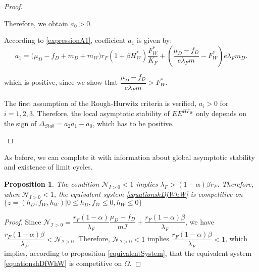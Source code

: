 \documentclass{article}
\newcommand{\lfw}{\lambda_{F}}
\newcommand{\lfw}{\lambda_{F}}
\newcommand{\cI}{\mathcal{I}}
\newtheorem{prop}{Proposition}
\begin{document}
\begin{proof}
\begin{itemize}
Therefore, we obtain $a_0 > 0$.

According to \eqref{expressionA1}, coefficient $a_1$ is given by:
\begin{equation*}
a_1 = \big( \mu_D  -f_D + m_D + m_W) r_F(1+ \beta H_W^*) \dfrac{F^*_W}{K_F} + \left(\dfrac{\mu_D -f_D}{e\lfw m} - F_W^*\right) e \lfw m_D .
\end{equation*}

which is positive, since we show that $\dfrac{\mu_D - f_D}{e \lfw m} > F^*_{W}$.

The first assumption of the Rough-Hurwitz criteria is verified, $a_i > 0$ for $i=1,2,3$. Therefore, the local asymptotic stability of $EE^{HF_W}$ only depends on the sign of $\Delta_{Stab}= a_2 a_1 - a_0$, which has to be positive.
\end{itemize}
\end{proof}

As before, we can complete it with information about global asymptotic stability and existence of limit cycles. 

\begin{prop}
The condition $\mathcal{N}_{I > 0} < 1$ implies $\lfw > (1-\alpha) \beta r_F$. Therefore, when $\mathcal{N}_{I > 0} < 1$, the equivalent system \eqref{equationshDfWhW} is competitive on $\Big\{z = (h_D, f_W, h_W) | 0 \leq h_D, f_W  \leq 0, h_W \leq 0 \Big\}$
\end{prop}

\begin{proof}
Since $\mathcal{N}_{\cI > 0} = \dfrac{r_F(1-\alpha)}{\lfw}\dfrac{\mu_D - f_D}{m \cI} + \dfrac{r_F(1-\alpha) \beta}{\lfw}$, we have $\dfrac{r_F(1-\alpha) \beta}{\lfw} < \mathcal{N}_{\cI > 0}$. Therefore, $\mathcal{N}_{\cI > 0} < 1$ implies $\dfrac{r_F(1-\alpha) \beta}{\lfw} < 1$, which implies, according to proposition \ref{equivalentSystem}, that the equivalent system \eqref{equationshDfWhW} is competitive on $\Omega$.
\end{proof}
\end{document}
